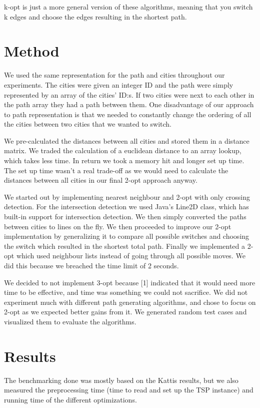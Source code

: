 \documentclass[article,11pt]{article}
\begin{document}
k-opt is just a more general version of these algorithms, meaning
that you switch k edges and choose the edges resulting in the
shortest path.
\section{Method}
We used the same representation for the path and cities throughout our
experiments. The cities were given an integer ID and the path were
simply represented by an array of the cities’ ID:s. If two cities were
next to each other in the path array they had a path between them. One
disadvantage of our approach to path representation is that we needed
to constantly change the ordering of all the cities between two cities
that we wanted to switch.

We pre-calculated the distances between all cities and stored them in
a distance matrix. We traded the calculation of a euclidean distance
to an array lookup, which takes less time. In return we took a memory
hit and longer set up time. The set up time wasn’t a real trade-off as
we would need to calculate the distances between all cities in our
final 2-opt approach anyway.

We started out by implementing nearest neighbour and 2-opt with only
crossing detection. For the intersection detection we used Java’s
Line2D class, which has built-in support for intersection
detection. We then simply converted the paths between cities to lines
on the fly. We then proceeded to improve our 2-opt implementation by
generalizing it to compare all possible switches and choosing the
switch which resulted in the shortest total path. Finally we
implemented a 2-opt which used neighbour lists instead of going
through all possible moves. We did this because we breached the time
limit of 2 seconds.

We decided to not implement 3-opt because [1] indicated that it would
need more time to be effective, and time was something we could not
sacrifice. We did not experiment much with different path generating
algorithms, and chose to focus on 2-opt as we expected better gains
from it. We generated random test cases and visualized them to
evaluate the algorithms.
\section{Results}
The benchmarking done was mostly based on the Kattis results, but we
also measured the preprocessing time (time to read and set up the TSP
instance) and running time of the different optimizations.
\end{document}
